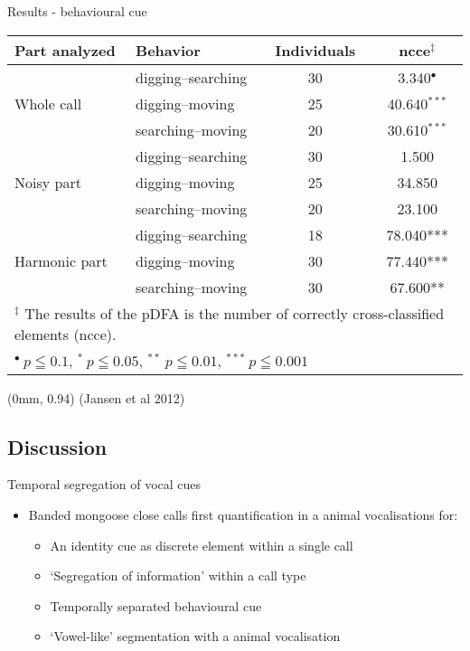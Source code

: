 \documentclass[xcolor=dvipsnames]{beamer}
\newcommand\References[1]{
\tiny{
  \begin{textblock*}{\paperwidth}(0mm, 0.94\paperheight)%
    \raggedleft (#1)\hspace{0.01\paperwidth}
  \end{textblock*}}}
\begin{document}
\begin{frame}{Results - behavioural cue}
\footnotesize
\begin{table}[h]
   \begin{tabular*}{0.9\textwidth}{@{\extracolsep{\fill}}llcc}
\hline
Part analyzed & Behavior & Individuals & ncce$^{\ddagger}$ \\ 
\hline
\multirow{3}[2]{*}{Whole call} & digging--searching & 30 & 3.340$^\bullet$ \\
          & digging--moving    & 25    & 40.640$^{***}$ \\
          & searching--moving    & 20    & 30.610$^{***}$ \\
\hline
 \multirow{3}[2]{*}{Noisy part} & digging--searching    & 30    & 1.500 \\
          & digging--moving    & 25    & 34.850 \\
          & searching--moving   & 20    & 23.100 \\
\hline
    \multirow{3}[2]{*}{Harmonic part} & digging--searching    & 18    & 78.040{***} \\
          & digging--moving    & 30    & 77.440{***} \\
          & searching--moving   & 30    & 67.600{**} \\
\hline 
\multicolumn{4}{l}{$^{\ddagger}$ \tiny{The results of the pDFA is the number of correctly cross-classified elements (ncce).}} \\
\multicolumn{4}{l}{\tiny{$^\bullet \:  p\leqq0.1$, $^{*} \: p\leqq0.05$, $^{**} \: p\leqq0.01$, $^{***} \: p \leqq 0.001$}}
\end{tabular*}
\end{table}
\References{Jansen et al 2012}
\end{frame}
\subsection{Discussion}
\begin{frame}{Temporal segregation of vocal cues}
\begin{itemize}
\item Banded mongoose close calls first quantification in a animal vocalisations for: 
\begin{itemize}
\item<2-> An identity cue as discrete element within a single call
\item<3-> `Segregation of information' within a call type
\item<4-> Temporally separated behavioural cue
\item<5-> `Vowel-like' segmentation with a animal vocalisation
\end{itemize}
\end{itemize}
\end{frame}
\end{document}
